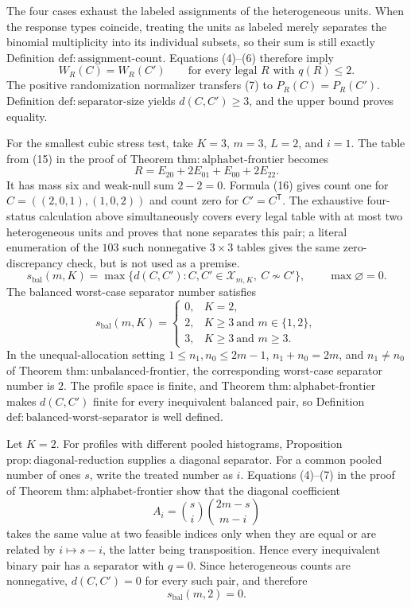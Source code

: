 The four cases exhaust the labeled assignments of the heterogeneous units. When the response types coincide, treating the units as labeled merely separates the binomial multiplicity into its individual subsets, so their sum is still exactly Definition \(\mathrm{def{:}assignment\text{-}count}\). Equations (4)--(6) therefore imply
\[
 W_R(C)=W_R(C')
 \qquad\text{for every legal }R\text{ with }q(R)\leq2.
 \tag{7}
\]
The positive randomization normalizer transfers (7) to \(P_R(C)=P_R(C')\). Definition \(\mathrm{def{:}separator\text{-}size}\) yields \(d(C,C')\geq3\), and the upper bound proves equality.

For the smallest cubic stress test, take \(K=3\), \(m=3\), \(L=2\), and \(i=1\). The table from (15) in the proof of Theorem \(\mathrm{thm{:}alphabet\text{-}frontier}\) becomes
\[
 R=E_{20}+2E_{01}+E_{00}+2E_{22}.
\]
It has mass six and weak-null sum \(2-2=0\). Formula (16) gives count one for \(C=((2,0,1),(1,0,2))\) and count zero for \(C'=C^{\mathsf T}\). The exhaustive four-status calculation above simultaneously covers every legal table with at most two heterogeneous units and proves that none separates this pair; a literal enumeration of the \(103\) such nonnegative \(3\times3\) tables gives the same zero-discrepancy check, but is not used as a premise.
\[
 s_{\mathrm{bal}}(m,K)
 =\max\bigl\{d(C,C'):C,C'\in\mathcal X_{m,K},\ C\not\sim C'\bigr\},
 \qquad \max\varnothing=0.
\]
The balanced worst-case separator number satisfies
\[
 s_{\mathrm{bal}}(m,K)=
 \begin{cases}
 0,&K=2,\\
 2,&K\geq3\ \text{and }m\in\{1,2\},\\
 3,&K\geq3\ \text{and }m\geq3.
 \end{cases}
\]
In the unequal-allocation setting \(1\leq n_1,n_0\leq2m-1\), \(n_1+n_0=2m\), and \(n_1\neq n_0\) of Theorem \(\mathrm{thm{:}unbalanced\text{-}frontier}\), the corresponding worst-case separator number is \(2\).
The profile space is finite, and Theorem \(\mathrm{thm{:}alphabet\text{-}frontier}\) makes \(d(C,C')\) finite for every inequivalent balanced pair, so Definition \(\mathrm{def{:}balanced\text{-}worst\text{-}separator}\) is well defined.

Let \(K=2\). For profiles with different pooled histograms, Proposition \(\mathrm{prop{:}diagonal\text{-}reduction}\) supplies a diagonal separator. For a common pooled number of ones \(s\), write the treated number as \(i\). Equations (4)--(7) in the proof of Theorem \(\mathrm{thm{:}alphabet\text{-}frontier}\) show that the diagonal coefficient
\[
 A_i=\binom si\binom{2m-s}{m-i}
\]
takes the same value at two feasible indices only when they are equal or are related by \(i\mapsto s-i\), the latter being transposition. Hence every inequivalent binary pair has a separator with \(q=0\). Since heterogeneous counts are nonnegative, \(d(C,C')=0\) for every such pair, and therefore
\[
 s_{\mathrm{bal}}(m,2)=0.
 \tag{1}
\]


